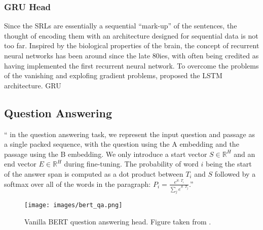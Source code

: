 \subsubsection{GRU Head}

Since the SRLs are essentially a sequential ``mark-up'' of the sentences, the thought of
encoding them with an architecture designed for sequential data is not too far. Inspired by
the biological properties of the brain, the concept of recurrent neural networks has been
around since the late 80ies, with \citep{hopfield1982neural} often being credited as having
implemented the first recurrent neural network. To overcome the problems of the vanishing
and explofing gradient problems, \citep{hochreiter1997long} proposed the LSTM architecture.
\citep{cho2014learning} GRU






\subsection{Question Answering}
\label{sec:question-answering}



``\textelp{} in the question answering task, we represent the input question and passage as
a single packed sequence, with the question using the A embedding and the passage using the
B embedding. We only introduce a start vector $S \in \mathbb{R}^H$ and an end vector $E \in
\mathbb{R}^H$ during fine-tuning. The probability of word $i$ being the start of the answer
span is computed as a dot product between $T_i$ and $S$ followed by a softmax over all of the
words in the paragraph: $P_i = \frac{e^{S\cdot T_i}}{\sum_{j}^{} e^{S\cdot T_j}}$.'' \citep{devlin2018bert}

\begin{wrapfigure}[16]{r}{0.45\linewidth}
  \begin{center}
    \texttt{[image: images/bert\_qa.png]}
  \end{center}
  \caption[BERT Q\&A]{Vanilla BERT question answering head. Figure taken from \citep{devlin2018bert}.}
\end{wrapfigure}



